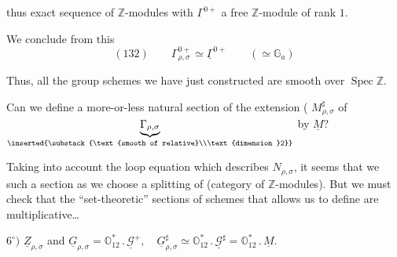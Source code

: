 
thus  exact sequence of $\mathbb Z$-modules
with $\Gamma^{0+}$ a free $\mathbb Z$-module of rank $1$.

We conclude from this
\[
(132)\qquad\Gamma_{\rho,\sigma}^{0+}\simeq\underline\Gamma^{0+}
\qquad(\simeq\mathbb G_a)
\]

 Thus, all the group schemes we have just constructed are smooth over $\operatorname{Spec}\mathbb Z$.

Can we define a more-or-less natural section of the extension
(
$M_{\rho,\sigma}^{\sharp}$ of
$\underbrace{\Gamma_{\rho,\sigma}}_{\inserted{\substack{\text{smooth of relative}\\\text{dimension }2}}}$
by $\underline M$?

Taking into account the loop equation which describes $N_{\rho,\sigma}$, it seems that we  such a section  as we choose a splitting of
(category of $\mathbb Z$-modules). But we must check that the \textquotedblleft set-theoretic\textquotedblright{} sections of schemes that  allows us to define are multiplicative\dots


\(6^\circ)\) \(\underline Z_{\rho,\sigma}\) and
\(\underline G_{\rho,\sigma}=\mathbb O_{12}^{*}\mathbin{.}\underline{\mathcal G}^{+},\quad
\underline G_{\rho,\sigma}^{\sharp}\simeq\mathbb O_{12}^{*}\mathbin{.}\underline{\mathcal G}^{\sharp}
=\mathbb O_{12}^{*}\mathbin{.}\underline M\).

